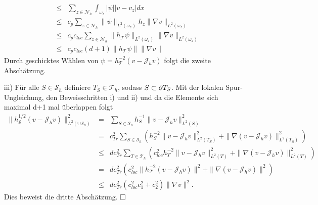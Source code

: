 \begin{itemize}
\begin{eqnarray*}
	 &\leq&\sum_{z\in \mathscr{N}_h}\int_{\omega_z} |\psi| |v-v_z|dx \\
	 &\leq&c_p \sum_{z\in \mathscr{N}_h}\|\psi\|_{L^2(\omega_z)}h_z\|\nabla v\|_{L^2(\omega_z)}\\
	 &\leq&c_pc_{loc}\sum_{z\in \mathscr{N}_h}\|h_{\mathscr{T}}\psi\|_{L^2(\omega_z)}\|\nabla v\|_{L^2(\omega_z)}\\
	  &\leq&c_pc_{loc}(d+1)\|h_{\mathscr{T}}\psi\|\|\nabla v\|
\end{eqnarray*}
Durch geschicktes Wählen von $\psi = h_{\mathscr{T}}^{-2}(v-\mathscr{J}_hv)$ folgt die zweite Abschätzung.
\item[iii)]
Für alle $S\in\mathscr{S}_h$ definiere $T_S\in\mathscr{T}_h$, sodass $S\subset\partial T_S$. Mit der lokalen Spur-Ungleichung, den Beweisschritten i) und ii) und da die Elemente sich maximal d+1 mal überlappen folgt
\begin{eqnarray*}
	\|h_{\mathscr{S}}^{1/2}(v-\mathscr{J}_hv)\|^2_{L^2(\cup \mathscr{S}_h)} &=& \sum_{S\in\mathscr{S}_h} h_S^{-1}\|v-\mathscr{J}_hv\|^2_{L^2(S)}\\
	 &=&c^2_{Tr} \sum_{S\in\mathscr{S}_h} (h_S^{-2}\|v-\mathscr{J}_hv\|^2_{L^2(T_S)} +
	 \|\nabla (v-\mathscr{J}_hv)\|^2_{L^2(T_S)})\\
	 &\leq&dc^2_{Tr} \sum_{T\in\mathscr{T}_h} (c_{loc}^2h_T^{-2}\|v-\mathscr{J}_hv\|^2_{L^2(T)} + \|\nabla (v-\mathscr{J}_hv)\|^2_{L^2(T)})\\
	 &=&dc^2_{Tr} (c_{loc}^2\|h_{\mathscr{T}}^{-2}(v-\mathscr{J}_hv)\|^2+ \|\nabla (v-\mathscr{J}_hv)\|^2)\\
	 &\leq&dc^2_{Tr}(c_{loc}^2c_1^2+c_2^2)\|\nabla v\|^2.
\end{eqnarray*}
Dies beweist die dritte Abschätzung.
$\hfill \Box$
\end{itemize}
